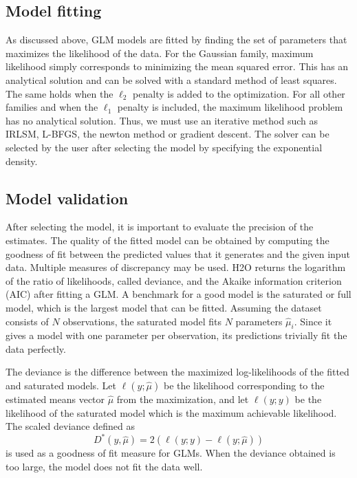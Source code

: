\subsection{Model fitting}
As discussed above, GLM models are fitted by finding the set of parameters that maximizes the likelihood of the data. For the Gaussian family, maximum likelihood simply corresponds to 
minimizing the mean squared error. This has an analytical solution and can be solved with a standard method of least squares. The same holds when the $\ell_2$ penalty is added to the optimization.  For all other families and when the $\ell_1$ penalty is included, the maximum likelihood problem has no analytical solution. Thus, we must use an iterative method such as IRLSM, L-BFGS, the newton method or gradient descent. The solver can be selected by the user after selecting the model by specifying the exponential density. 

\subsection{Model validation}

After selecting the model, it is important to evaluate the precision of the estimates. The quality of the fitted model can be obtained 
by computing the goodness of fit between the predicted values that it generates and the given input data. Multiple measures of discrepancy may be used. H2O returns the logarithm of the ratio of likelihoods, called deviance, and the Akaike information criterion (AIC) after fitting a GLM. A benchmark for a good model is the saturated or full model, which is the largest model that can be fitted. Assuming the dataset consists of $N$ observations, the saturated model fits $N$ parameters $\hat{\mu}_i$. Since it gives a model with one parameter per observation, its predictions trivially fit the data perfectly.

The deviance is the difference between the maximized log-likelihoods of the fitted and saturated models. Let $\ell(y;\hat{\mu})$ be the likelihood corresponding to the estimated means vector $\hat{\mu}$ from the maximization, and let $\ell(y;y)$ be the likelihood of the saturated model which is the maximum achievable likelihood. The scaled deviance defined as 
$$ D^*(y,\hat{\mu}) = 2 (\ell(y;y)-\ell(y;\hat{\mu}) )$$
is used as a goodness of fit measure for GLMs. When the deviance obtained is too large, the model does not fit the data well. 

%

